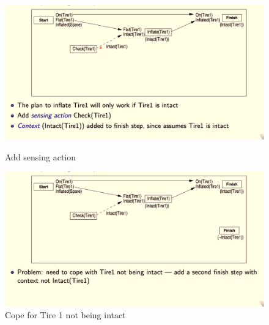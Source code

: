 \documentclass[a4paper]{article}
\theoremstyle{plain}
\theoremstyle{definition}
\theoremstyle{remark}
\begin{document}
\begin{figure}[H]
   \begin{minipage}{0.48\textwidth}
     \centering
     \includegraphics[width=1\linewidth]{plan/3.png}
     \caption{Add sensing action}\label{Fig:4Data1}
   \end{minipage}\hfill
   \begin{minipage}{0.48\textwidth}
     \centering
     \includegraphics[width=1\linewidth]{plan/4.png}
     \caption{Cope for Tire 1 not being intact}\label{Fig:Data2}
   \end{minipage}
\end{figure}
\end{document}
